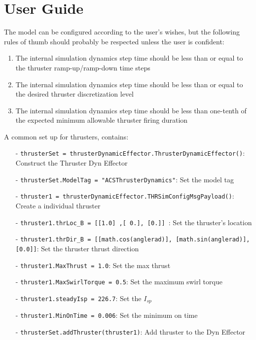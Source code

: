 \section{User Guide}

The model can be configured according to the user's wishes, but the following
rules of thumb should probably be respected unless the user is confident:
\begin{enumerate}
\item{The internal simulation dynamics step time should be less than or equal
     to the thruster ramp-up/ramp-down time steps}
\item{The internal simulation dynamics step time should be less than or equal to
     the desired thruster discretization level}
\item{The internal simulation dynamics step time should be less than one-tenth
    of the expected minimum allowable thruster firing duration}
\end{enumerate}

A common set up for thrusters, contains:

\begin{itemize}
  \item[-]      \texttt{thrusterSet = thrusterDynamicEffector.ThrusterDynamicEffector()}: Construct the Thruster Dyn Effector
  \item[-]   \texttt{thrusterSet.ModelTag = "ACSThrusterDynamics"}: Set the model tag
  \item[-]   \texttt{thruster1 = thrusterDynamicEffector.THRSimConfigMsgPayload()}: Create a individual thruster
  \item[-]   \texttt{thruster1.thrLoc\_B = [[1.0] ,[ 0.], [0.]] }: Set the thruster's location
  \item[-]   \texttt{thruster1.thrDir\_B = [[math.cos(anglerad)], [math.sin(anglerad)], [0.0]]}: Set the thruster thrust direction
  \item[-]   \texttt{thruster1.MaxThrust = 1.0}: Set the max thrust
  \item[-]   \texttt{thruster1.MaxSwirlTorque = 0.5}: Set the maximum swirl torque
  \item[-]   \texttt{thruster1.steadyIsp = 226.7}: Set the $I_{sp}$
  \item[-]   \texttt{thruster1.MinOnTime = 0.006}: Set the minimum on time
  \item[-]   \texttt{thrusterSet.addThruster(thruster1)}: Add thruster to the Dyn Effector
\end{itemize}

